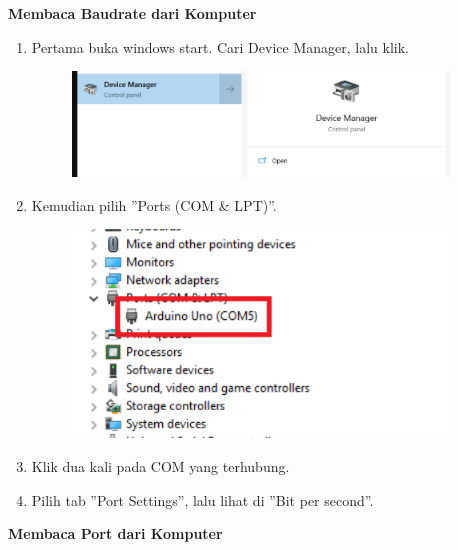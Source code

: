 \hfill \break
\textbf{Membaca Baudrate dari Komputer}
\begin{enumerate}
	\item Pertama buka windows start. Cari Device Manager, lalu klik.
	\begin{figure}[H]
		\includegraphics[width=10cm]{figures/5/1174021/Teori/11.png}
		\centering
	\end{figure}
	
	\item Kemudian pilih ''Ports (COM \& LPT)''.
	\begin{figure}[H]
		\includegraphics[width=10cm]{figures/5/1174021/Teori/12.png}
		\centering
	\end{figure}
	
	\item Klik dua kali pada COM yang terhubung.
	\item Pilih tab ''Port Settings'', lalu lihat di ''Bit per second''.
\end{enumerate}


\hfill \break
\textbf{Membaca Port dari Komputer}

